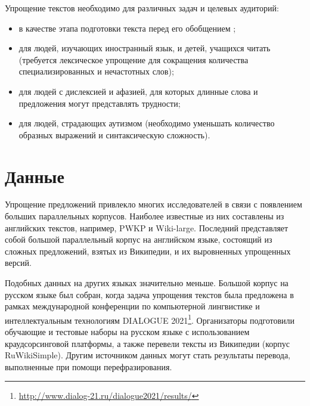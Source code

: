 	
	
	
	

Упрощение текстов необходимо для различных задач и целевых аудиторий: 
\begin{itemize}
	\item в качестве этапа подготовки текста перед его обобщением \cite{finegan_dollak_sentence_2016}; 
	\item для людей, изучающих иностранный язык, и детей, учащихся читать (требуется лексическое упрощение для сокращения количества специализированных и нечастотных слов)\cite{liu_simplification_2016};
	\item для людей с дислексией и афазией, для которых длинные слова и предложения могут представлять трудности;
	\item для людей, страдающих аутизмом (необходимо уменьшать количество образных выражений и синтаксическую сложность)\cite{evans_evaluation_2014}.
\end{itemize}

\section{Данные}

Упрощение предложений привлекло многих исследователей в связи с появлением больших параллельных корпусов. Наиболее известные из них составлены из английских текстов, например, PWKP и Wiki-large. Последний представляет собой большой параллельный корпус на английском языке, состоящий из сложных предложений, взятых из Википедии, и их выровненных упрощенных версий.

Подобных данных на других языках значительно меньше. Большой корпус на русском языке был собран, когда задача упрощения текстов была предложена в рамках международной конференции по компьютерной лингвистике и интеллектуальным технологиям DIALOGUE 2021\footnote{\url{http://www.dialog-21.ru/dialogue2021/results/}}. Организаторы подготовили обучающие и тестовые наборы на русском языке с использованием краудсорсинговой платформы, а также перевели тексты из Википедии (корпус RuWikiSimple). Другим источником данных могут стать результаты перевода, выполненные при помощи перефразирования\cite{kazan_federal_university}.  

